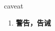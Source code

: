 
\begin{frame}
{\huge caveat}
\begin{center}
\begin{enumerate}\Large
  \item \textbf{警告，告诫}
\end{enumerate}
\end{center}
\end{frame}
